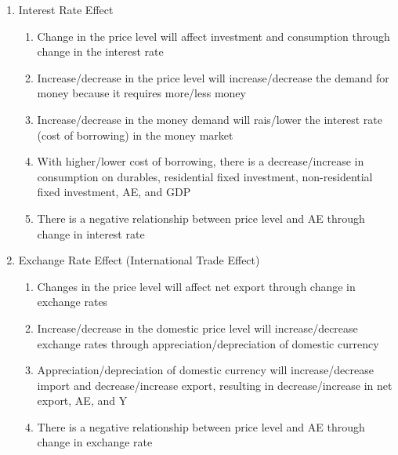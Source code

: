 \documentclass[12pt]{article}
\begin{document}
\begin{enumerate}
\begin{enumerate}
\begin{enumerate}
\begin{enumerate}
                \end{enumerate}

              \item Interest Rate Effect

                \begin{enumerate}

                  \item Change in the price level will affect investment and consumption through change in the interest rate

                  \item Increase/decrease in the price level will increase/decrease the demand for money because it requires more/less money 

                  \item Increase/decrease in the money demand will rais/lower the interest rate (cost of borrowing) in the money market

                  \item With higher/lower cost of borrowing, there is a decrease/increase in consumption on durables, residential fixed investment, non-residential fixed investment, AE, and GDP

                  \item There is a negative relationship between price level and AE through change in interest rate

                \end{enumerate}

              \item Exchange Rate Effect (International Trade Effect)

                \begin{enumerate}

                  \item Changes in the price level will affect net export through change in exchange rates

                  \item Increase/decrease in the domestic price level will increase/decrease exchange rates through appreciation/depreciation of domestic currency

                  \item Appreciation/depreciation of domestic currency will increase/decrease import and decrease/increase export, resulting in decrease/increase in net export, AE, and Y

                  \item There is a negative relationship between price level and AE through change in exchange rate


\end{enumerate}
\end{enumerate}
\end{enumerate}
\end{enumerate}
\end{document}
